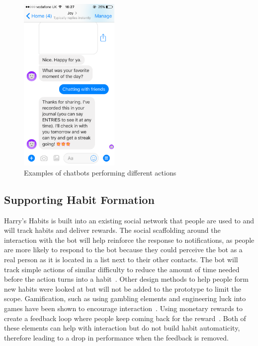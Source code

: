 \begin{figure}[H]
  \hspace{10px}
  \includegraphics[width=1.9in]{../resources/existing-bots/joy-ai.png}
  \caption{Examples of chatbots performing different actions}
  \label{fig:chatbots_examples}
\end{figure}


\subsection*{Supporting Habit Formation}
Harry's Habits is built into an existing social network that people are used to and will track habits and deliver rewards. The social scaffolding around the interaction with the bot will help reinforce the response to notifications, as people are more likely to respond to the bot because they could perceive the bot as a real person as it is located in a list next to their other contacts. The bot will track simple actions of similar difficulty to reduce the amount of time needed before the action turns into a habit~\cite{article_how_habits_formed_modelling_habit_formation}. Other design methods to help people form new habits were looked at but will not be added to the prototype to limit the scope. Gamification, such as using gambling elements and engineering luck into games have been shown to encourage interaction~\cite{article_free_to_play_making_money_from_games_you_give_away}. Using monetary rewards to create a feedback loop where people keep coming back for the reward~\cite{website_how_to_design_feedback_loops}. Both of these elements can help with interaction but do not build habit automaticity, therefore leading to a drop in performance when the feedback is removed.

